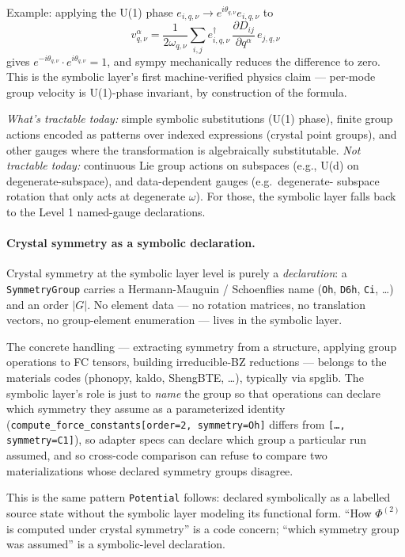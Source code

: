 \documentclass[11pt,a4paper]{article}
\begin{document}
Example: applying the U(1) phase $e_{i,q,\nu} \to e^{i\theta_{q,\nu}}
e_{i,q,\nu}$ to
\begin{equation*}
  v^\alpha_{q,\nu} = \frac{1}{2\omega_{q,\nu}} \sum_{i,j} e^\dagger_{i,q,\nu}\,
    \frac{\partial D_{ij}}{\partial q^\alpha}\, e_{j,q,\nu}
\end{equation*}
gives $e^{-i\theta_{q,\nu}} \cdot e^{i\theta_{q,\nu}} = 1$, and sympy
mechanically reduces the difference to zero. This is the symbolic layer's
first machine-verified physics claim --- per-mode group velocity is
U(1)-phase invariant, by construction of the formula.

\emph{What's tractable today:} simple symbolic substitutions (U(1)
phase), finite group actions encoded as patterns over indexed
expressions (crystal point groups), and other gauges where the
transformation is algebraically substitutable. \emph{Not tractable
today:} continuous Lie group actions on subspaces (e.g., U(d) on
degenerate-subspace), and data-dependent gauges (e.g.\ degenerate-
subspace rotation that only acts at degenerate $\omega$). For those,
the symbolic layer falls back to the Level 1 named-gauge declarations.

\paragraph{Crystal symmetry as a symbolic declaration.} Crystal symmetry
at the symbolic layer level is purely a \emph{declaration}: a
\texttt{SymmetryGroup} carries a Hermann-Mauguin / Schoenflies name
(\texttt{Oh}, \texttt{D6h}, \texttt{Ci}, \ldots) and an order $|G|$.
No element data --- no rotation matrices, no translation vectors, no
group-element enumeration --- lives in the symbolic layer.

The concrete handling --- extracting symmetry from a structure,
applying group operations to FC tensors, building irreducible-BZ
reductions --- belongs to the materials codes (phonopy, kaldo,
ShengBTE, \ldots), typically via spglib. The symbolic layer's role is just to
\emph{name} the group so that operations can declare which symmetry they
assume as a parameterized identity
(\texttt{compute\_force\_constants[order=2, symmetry=Oh]} differs from
\texttt{[\ldots, symmetry=C1]}), so adapter specs can declare which
group a particular run assumed, and so cross-code comparison can refuse
to compare two materializations whose declared symmetry groups disagree.

This is the same pattern \texttt{Potential} follows: declared symbolically
as a labelled source state without the symbolic layer modeling its functional
form. ``How $\Phi^{(2)}$ is computed under crystal symmetry'' is a code
concern; ``which symmetry group was assumed'' is a symbolic-level
declaration.
\end{document}
